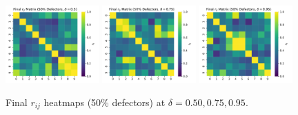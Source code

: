 \documentclass[11pt,a4paper]{article}
\begin{document}
\begin{figure}[h!]
  \centering
  \includegraphics[width=0.32\textwidth]{rij_heatmap_50pct_delta_05.pdf}
  \includegraphics[width=0.32\textwidth]{rij_heatmap_50pct_delta_075.pdf}
  \includegraphics[width=0.32\textwidth]{rij_heatmap_50pct_delta_095.pdf}
  \caption{Final $r_{ij}$ heatmaps (50\% defectors) at $\delta=0.50,0.75,0.95$.}
\end{figure}
\end{document}
